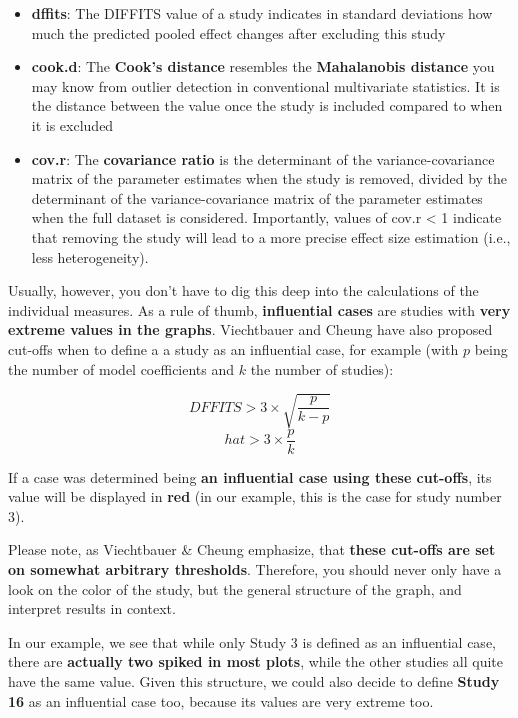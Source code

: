 \documentclass[]{book}
\providecommand{\tightlist}{%
  \setlength{\itemsep}{0pt}\setlength{\parskip}{0pt}}
\theoremstyle{definition}
\theoremstyle{definition}
\theoremstyle{definition}
\theoremstyle{remark}
\begin{document}
\begin{itemize}
\tightlist
\item
  \textbf{dffits}: The DIFFITS value of a study indicates in standard
  deviations how much the predicted pooled effect changes after
  excluding this study
\item
  \textbf{cook.d}: The \textbf{Cook's distance} resembles the
  \textbf{Mahalanobis distance} you may know from outlier detection in
  conventional multivariate statistics. It is the distance between the
  value once the study is included compared to when it is excluded
\item
  \textbf{cov.r}: The \textbf{covariance ratio} is the determinant of
  the variance-covariance matrix of the parameter estimates when the
  study is removed, divided by the determinant of the
  variance-covariance matrix of the parameter estimates when the full
  dataset is considered. Importantly, values of cov.r \textless{} 1
  indicate that removing the study will lead to a more precise effect
  size estimation (i.e., less heterogeneity).
\end{itemize}

Usually, however, you don't have to dig this deep into the calculations
of the individual measures. As a rule of thumb, \textbf{influential
cases} are studies with \textbf{very extreme values in the graphs}.
Viechtbauer and Cheung have also proposed cut-offs when to define a a
study as an influential case, for example (with \(p\) being the number
of model coefficients and \(k\) the number of studies):

\[ DFFITS > 3\times\sqrt{\frac{p}{k-p}}\] \[ hat > 3\times\frac{p}{k}\]

If a case was determined being \textbf{an influential case using these
cut-offs}, its value will be displayed in \textbf{red} (in our example,
this is the case for study number 3).

\begin{rmdachtung}
Please note, as Viechtbauer \& Cheung emphasize, that \textbf{these
cut-offs are set on somewhat arbitrary thresholds}. Therefore, you
should never only have a look on the color of the study, but the general
structure of the graph, and interpret results in context.

In our example, we see that while only Study 3 is defined as an
influential case, there are \textbf{actually two spiked in most plots},
while the other studies all quite have the same value. Given this
structure, we could also decide to define \textbf{Study 16} as an
influential case too, because its values are very extreme too.
\end{rmdachtung}
\end{document}
